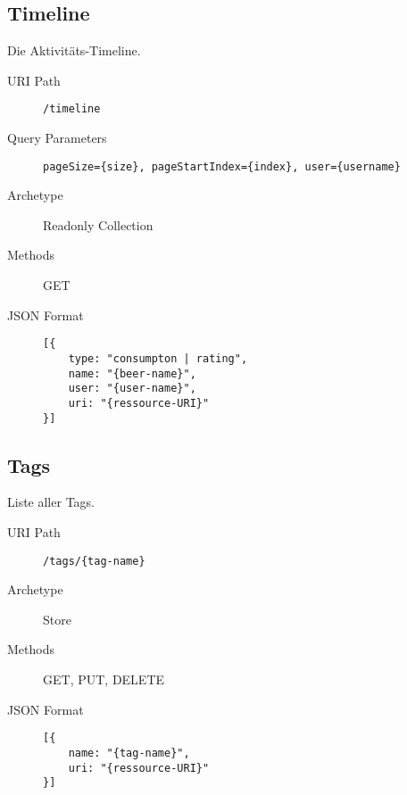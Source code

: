 \documentclass[10pt,a4paper]{scrartcl}
\begin{document}
\subsection{Timeline}

Die Aktivitäts-Timeline.

\begin{description}
 	\item[URI Path] \texttt{/timeline}
	\item[Query Parameters] \texttt{pageSize=\{size\}, pageStartIndex=\{index\}, user=\{username\}}
	\item[Archetype] Readonly Collection
	\item[Methods] GET
	\item[JSON Format] \hfill
\begin{lstlisting}
[{	
	type: "consumpton | rating",
	name: "{beer-name}",
	user: "{user-name}",
	uri: "{ressource-URI}"
}]
\end{lstlisting}
\end{description}


\subsection{Tags}

Liste aller Tags.

\begin{description}
	\item[URI Path] \texttt{/tags/\{tag-name\}}
	\item[Archetype] Store
	\item[Methods] GET, PUT, DELETE
	\item[JSON Format] \hfill
\begin{lstlisting}
[{	
	name: "{tag-name}",
	uri: "{ressource-URI}"
}]
\end{lstlisting}
\end{description}




\end{document}
